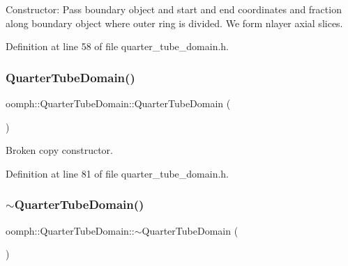 Constructor\+: Pass boundary object and start and end coordinates and fraction along boundary object where outer ring is divided. We form nlayer axial slices. 



Definition at line 58 of file quarter\+\_\+tube\+\_\+domain.\+h.

\mbox{\label{classoomph_1_1QuarterTubeDomain_a3784528b5fb419be94556912166975f8}} 
\subsubsection{\texorpdfstring{Quarter\+Tube\+Domain()}{QuarterTubeDomain()}\hspace{0.1cm}{\footnotesize\ttfamily [2/2]}}
{\footnotesize\ttfamily oomph\+::\+Quarter\+Tube\+Domain\+::\+Quarter\+Tube\+Domain (\begin{DoxyParamCaption}\item[{const \hyperlink{classoomph_1_1QuarterTubeDomain}{Quarter\+Tube\+Domain} \&}]{ }\end{DoxyParamCaption})\hspace{0.3cm}{\ttfamily [inline]}}



Broken copy constructor. 



Definition at line 81 of file quarter\+\_\+tube\+\_\+domain.\+h.

\mbox{\label{classoomph_1_1QuarterTubeDomain_a191be8daa569473cebcc1466d8235175}} 
\subsubsection{\texorpdfstring{$\sim$\+Quarter\+Tube\+Domain()}{~QuarterTubeDomain()}}
{\footnotesize\ttfamily oomph\+::\+Quarter\+Tube\+Domain\+::$\sim$\+Quarter\+Tube\+Domain (\begin{DoxyParamCaption}{ }\end{DoxyParamCaption})\hspace{0.3cm}{\ttfamily [inline]}}



